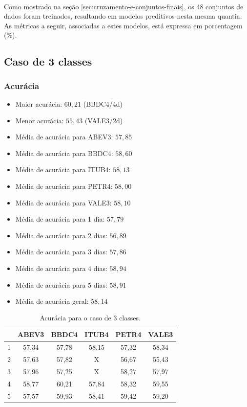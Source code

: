 \documentclass[grad,numbers]{coppe}
\begin{document}
 			\paragraph{}Como mostrado na seção \ref{sec:cruzamento-e-conjuntos-finais}, os 48 conjuntos de dados foram treinados, resultando em modelos preditivos nesta mesma quantia. As métricas a seguir, associadas a estes modelos, está expressa em porcentagem (\%).
 			\newpage
 			\subsection{Caso de 3 classes}
 				\subsubsection{Acurácia}
		 			\begin{itemize}
		 				\item Maior acurácia: $60,21$ (BBDC4/4d)
		 				\item Menor acurácia: $55,43$ (VALE3/2d)
		 				\item Média de acurácia para ABEV3: $57,85$
		 				\item Média de acurácia para BBDC4: $58,60$
		 				\item Média de acurácia para ITUB4: $58,13$
		 				\item Média de acurácia para PETR4: $58,00$
		 				\item Média de acurácia para VALE3: $58,10$
		 				\item Média de acurácia para 1 dia: $57,79$
		 				\item Média de acurácia para 2 dias: $56,89$
		 				\item Média de acurácia para 3 dias: $57,86$
		 				\item Média de acurácia para 4 dias: $58,94$
		 				\item Média de acurácia para 5 dias: $58,91$
		 				\item Média de acurácia geral: $58,14$
		 			\end{itemize}
		 			\begin{table}[h]
		 				\caption{Acurácia para o caso de 3 classes.}
		 				\label{tab:3c_ac_analysis}
		 				\centering
		 				{\footnotesize
		 					\begin{tabular}{|c|c|c|c|c|c|}
		 						\hline
		 						\diagbox[linewidth=0.2pt, width=\dimexpr \textwidth/10+2\tabcolsep\relax, height=0.8cm]{Dias}{Ativo}
		 						& ABEV3 & BBDC4 & ITUB4 & PETR4 & VALE3\\
		 						\hline
		 						1 & 57,34 & 57,78 & 58,15 & 57,32 & 58,34 \\
		 						2 & 57,63 & 57,82 & X     & 56,67 & 55,43 \\
		 						3 & 57,96 & 57,25 & X     & 58,27 & 57,97 \\
		 						4 & 58,77 & 60,21 & 57,84 & 58,32 & 59,55 \\
		 						5 & 57,57 & 59,93 & 58,41 & 59,42 & 59,20 \\
		 						\hline
		 				\end{tabular}}
		 			\end{table}
	 			\newpage
\end{document}
